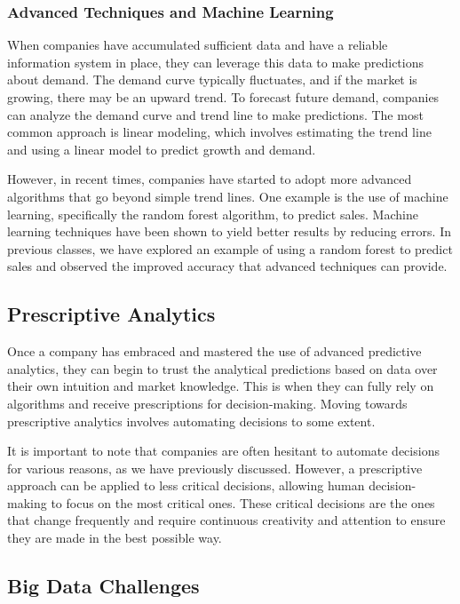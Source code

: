 \subsubsection{Advanced Techniques and Machine Learning}

When companies have accumulated sufficient data and have a reliable
information system in place, they can leverage this data to make
predictions about demand. The demand curve typically fluctuates, and if
the market is growing, there may be an upward trend. To forecast future
demand, companies can analyze the demand curve and trend line to make
predictions. The most common approach is linear modeling, which involves
estimating the trend line and using a linear model to predict growth and
demand.

However, in recent times, companies have started to adopt more advanced
algorithms that go beyond simple trend lines. One example is the use of
machine learning, specifically the random forest algorithm, to predict
sales. Machine learning techniques have been shown to yield better
results by reducing errors. In previous classes, we have explored an
example of using a random forest to predict sales and observed the
improved accuracy that advanced techniques can provide.

\subsection{Prescriptive Analytics}

Once a company has embraced and mastered the use of advanced predictive
analytics, they can begin to trust the analytical predictions based on
data over their own intuition and market knowledge. This is when they
can fully rely on algorithms and receive prescriptions for
decision-making. Moving towards prescriptive analytics involves
automating decisions to some extent.

It is important to note that companies are often hesitant to automate
decisions for various reasons, as we have previously discussed. However,
a prescriptive approach can be applied to less critical decisions,
allowing human decision-making to focus on the most critical ones. These
critical decisions are the ones that change frequently and require
continuous creativity and attention to ensure they are made in the best
possible way.

\subsection{Big Data Challenges}

